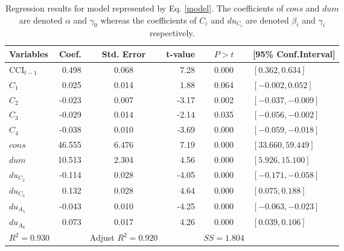 \documentclass[10pt]{article}
\begin{document}
 \begin {table}
 \begin {center}
	 \begin {tabular} {lrcrcl}
	 \hline
	Variables                    &	Coef.	&	Std. Error	&	 t-value	         &	$P>t$	      &  	[95\% Conf.Interval]		\\
	 \hline
	
	 $\mbox{CCI}_{t-1}$	         &	0.498	&	0.068	&	7.28	         &	0.000	       &	$[0.362, 0.634]$	\\
	$C_1$	                 &	0.025	&	0.014	&	1.88	         &	0.064	       &	$[-0.002,	  0.052]$	\\
	$C_2$	                 &	-0.023	&	0.007	&	-3.17  	&	0.002	       &	$[-0.037,	-0.009]$	\\
	$C_3$	                 &	-0.029	&	0.014	&	-2.14	         &	0.035	       &	$[-0.056, -0.002]$	\\
	$C_4$	                 &	-0.038	&	0.010	&	-3.69	         &	0.000               &	$[-0.059,	-0.018]$	\\
	 $cons$              	&	46.555      &	6.476	&	7.19	         &	0.000              &	$[33.660,	59.449]$	\\
	$dum$	                 &	10.513	&	2.304	&	4.56	        &	0.000	        &	$[5.926,	15.100]$	\\
	$du_{C_2}$	         &	-0.114	&	0.028	&	-4.05	        &	0.000	        &	$[-0.171,	-0.058]$	\\
	$du_{C_3}$	         &	0.132	&	0.028	&	4.64	        &	0.000	        &	$[0.075,	0.188]$	\\
	$du_{A_5}$	         &	-0.043	&	0.010	&	-4.25	        &	0.000	        &	$[-0.063,	-0.023]$	\\
	$du_{A_6}$	         &	0.073	&	0.017	&	4.26	        &	0.000	        &	$[0.039,	0.106]$	\\
	
	 \hline
	 $R^2=0.930$			&&	Adjust $R^2=0.920$			   &              &	$SS=1.804$				\\
	 \hline
	 \end {tabular}
	 \caption{Regression results for model represented by Eq. \ref{model}. The coefficients of $cons$ and $dum$ are denoted $\alpha$ and $\gamma_0$ whereas the coefficients of $C_i$ and $du_{C_i}$ are denoted $\beta_i$ and $\gamma_i$ respectively.}
	 \label{RegressionResults}
 \end{center}
 \end {table}
\end{document}
